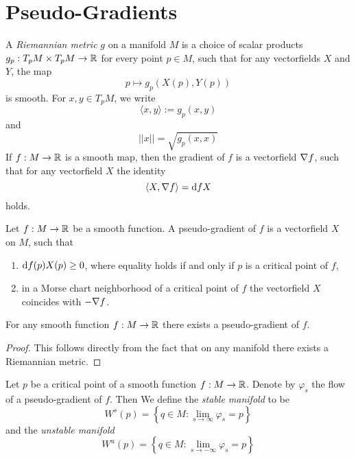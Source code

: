 \section{Pseudo-Gradients}

\begin{definition}
    A \textit{Riemannian metric} $g$ on a manifold $M$ is a choice of scalar products
    $g_p: T_pM \times T_pM \to { \mathbb R }$ for every point $p \in M$, such that for any vectorfields
    $X$ and $Y$, the map
    \[ p \mapsto g_p(X(p), Y(p)) \]
    is smooth. For $x, y \in T_pM$, we write 
    \[ \langle x, y \rangle := g_p(x, y)\]
    and 
    \[ || x || = \sqrt{g_p(x, x)} \]
    If $f: M \to { \mathbb R }$ is a smooth map, then the gradient of $f$ is a vectorfield ${ \nabla } f$, such
    that for any vectorfield $X$ the identity
    \[ \langle X, { \nabla } f \rangle = { \operatorname{d} } f X \]
    holds.
\end{definition}

\begin{definition}
    Let $f: M \to { \mathbb R }$ be a smooth function. A pseudo-gradient of $f$ is a vectorfield
    $X$ on $M$, such that 
    \begin{enumerate}
        \item ${ \operatorname{d} } f(p) X(p) \geq 0$, where equality holds if and only if $p$ is a 
            critical point of $f$,
        \item in a Morse chart neighborhood of a critical point of $f$ the vectorfield
            $X$ coincides with $- { \nabla } f$.
    \end{enumerate}
\end{definition}

\begin{lemma}
    For any smooth function $f: M \to { \mathbb R }$ there exists a pseudo-gradient of $f$.
\end{lemma}

\begin{proof}
    This follows directly from the fact that on any manifold there exists a Riemannian metric.
\end{proof}

\begin{definition}
    Let $p$ be a critical point of a smooth function $f: M \to { \mathbb R }$. Denote by $\varphi_s$ the
    flow of a pseudo-gradient of $f$. Then We define the \textit{stable manifold} to be
    \[ W^s(p) = \left\{ q \in M: \lim_{s \to \infty} \varphi_s = p \right\} \]
    and the \textit{unstable manifold}
    \[ W^u(p) = \left\{ q \in M: \lim_{s \to -\infty} \varphi_s = p \right\} \]
\end{definition}

